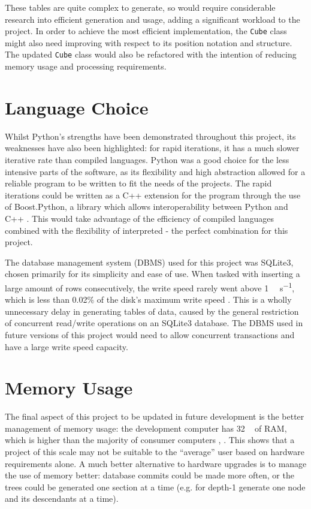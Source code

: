 \documentclass{report}
\newcommand{\depth}[1]{depth-#1}
\begin{document}
	These tables are quite complex to generate, so would require considerable research into efficient generation and usage, adding a significant workload to the project. In order to achieve the most efficient implementation, the \lstinline|Cube| class might also need improving with respect to its position notation and structure. The updated \lstinline|Cube| class would also be refactored with the intention of reducing memory usage and processing requirements.
	
	\section{Language Choice}
	
	Whilst Python's strengths have been demonstrated throughout this project, its weaknesses have also been highlighted: for rapid iterations, it has a much slower iterative rate than compiled languages. Python was a good choice for the less intensive parts of the software, as its flexibility and high abstraction allowed for a reliable program to be written to fit the needs of the projects. The rapid iterations could be written as a C++ extension for the program through the use of Boost.Python, a library which allows interoperability between Python and C++ \cite{Abrahams2015}. This would take advantage of the efficiency of compiled languages combined with the flexibility of interpreted - the perfect combination for this project.
	
	The database management system (DBMS) used for this project was SQLite3, chosen primarily for its simplicity and ease of use. When tasked with inserting a large amount of rows consecutively, the write speed rarely went above 1 \si{\mega\byte\per\second}, which is less than 0.02\% of the disk's maximum write speed \cite{Samsung2016}. This is a wholly unnecessary delay in generating tables of data, caused by the general restriction of concurrent read/write operations on an SQLite3 database. The DBMS used in future versions of this project would need to allow concurrent transactions and have a large write speed capacity.
	
	\section{Memory Usage}
	
	The final aspect of this project to be updated in future development is the better management of memory usage: the development computer has 32 \si{\giga\byte} of RAM, which is higher than the majority of consumer computers \cite{TechTalk2018}, \cite{Steam2018}. This shows that a project of this scale may not be suitable to the \enquote{average} user based on hardware requirements alone. A much better alternative to hardware upgrades is to manage the use of memory better: database commits could be made more often, or the trees could be generated one section at a time (e.g. for \depth{1} generate one node and its descendants at a time).
	
\end{document}
